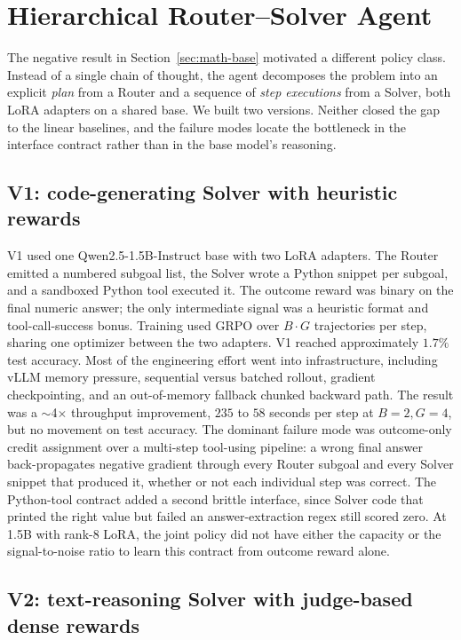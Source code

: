 \documentclass[11pt]{article}
\begin{document}
\section{Hierarchical Router--Solver Agent}
\label{sec:router-solver}

The negative result in Section~\ref{sec:math-base} motivated a different policy class. Instead of a single chain of thought, the agent decomposes the problem into an explicit \emph{plan} from a Router and a sequence of \emph{step executions} from a Solver, both LoRA adapters on a shared base. We built two versions. Neither closed the gap to the linear baselines, and the failure modes locate the bottleneck in the interface contract rather than in the base model's reasoning.

\subsection{V1: code-generating Solver with heuristic rewards}
\label{sec:rsv1}

V1 used one Qwen2.5-1.5B-Instruct base with two LoRA adapters. The Router emitted a numbered subgoal list, the Solver wrote a Python snippet per subgoal, and a sandboxed Python tool executed it. The outcome reward was binary on the final numeric answer; the only intermediate signal was a heuristic format and tool-call-success bonus. Training used GRPO over $B \cdot G$ trajectories per step, sharing one optimizer between the two adapters. V1 reached approximately $1.7\%$ test accuracy. Most of the engineering effort went into infrastructure, including vLLM memory pressure, sequential versus batched rollout, gradient checkpointing, and an out-of-memory fallback chunked backward path. The result was a $\sim$4$\times$ throughput improvement, $235$ to $58$ seconds per step at $B{=}2, G{=}4$, but no movement on test accuracy. The dominant failure mode was outcome-only credit assignment over a multi-step tool-using pipeline: a wrong final answer back-propagates negative gradient through every Router subgoal and every Solver snippet that produced it, whether or not each individual step was correct. The Python-tool contract added a second brittle interface, since Solver code that printed the right value but failed an answer-extraction regex still scored zero. At 1.5B with rank-8 LoRA, the joint policy did not have either the capacity or the signal-to-noise ratio to learn this contract from outcome reward alone.

\subsection{V2: text-reasoning Solver with judge-based dense rewards}
\label{sec:rsv2}
\end{document}
